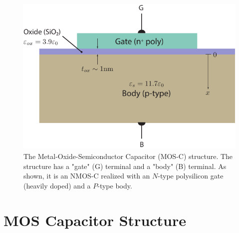 \newpage
\begin{figure}[t]
\centering
\includegraphics[width=\columnwidth]{mos_cap_structure}
\caption{The Metal-Oxide-Semiconductor Capacitor  (MOS-C) structure.  The structure has a "gate" (G) terminal and a "body" (B) terminal.  As shown, it is an NMOS-C realized with an $N$-type polysilicon gate (heavily doped) and a $P$-type body.}
\label{fig:mos_cap}
\end{figure}
\section{MOS Capacitor Structure}
